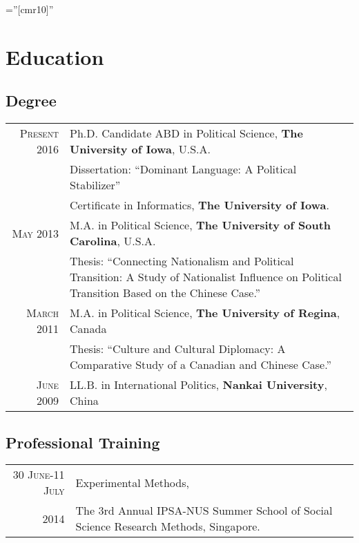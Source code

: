 \documentclass[a4paper,10pt]{article} %
\begin{document}

\font\fb=''[cmr10]'' %


\par{\bigskip\par} %

\section{Education}
	\subsection*{Degree}
		\begin{tabular}{rp{}}	
			\textsc{Present} 2016 & Ph.D. Candidate ABD in Political Science, \textbf{The University of Iowa}, U.S.A.\\
			& \footnotesize Dissertation: ``Dominant Language: A Political Stabilizer'' \\
			& Certificate in Informatics, \textbf{The University of Iowa}.\\[5pt]
			
			\textsc{May} 2013& M.A. in Political Science, \textbf{The University of South Carolina}, U.S.A.\\
			& \footnotesize Thesis: ``Connecting Nationalism and Political Transition: A Study of Nationalist Influence on Political Transition Based on the Chinese Case.'' \\[5pt]
			
			\textsc{March} 2011& M.A. in Political Science, \textbf{The University of Regina}, Canada\\
			& \footnotesize Thesis: ``Culture and Cultural Diplomacy: A Comparative Study of a Canadian and Chinese Case.'' \\[5pt]
			
			\textsc{June} 2009& LL.B. in International Politics, \textbf{Nankai University}, China
		\end{tabular}
	
	\subsection*{Professional Training}
		\begin{tabular}{rp{}}	
			\textsc{30 June-11 July}& Experimental Methods,\\
			2014& The 3rd Annual IPSA-NUS Summer School of Social Science Research Methods, Singapore. 
		\end{tabular}
\end{document}
